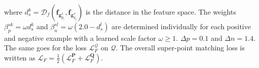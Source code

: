 where $d_s^k=\mathcal{D}_f(\bm{f}_{\bm{g}^s_{\bar{p}_i}},\bm{f}_{\bm{g}^s_{\bar{q}_j}})$ is the distance in the feature space. The weights $\beta_p^{sk}=\omega d_s^k$ and $\beta_n^{sl}{=}\omega (2.0-d_s^l)$ are determined individually for each positive and negative example with a learned scale factor $\omega\geq 1$. $\Delta p = 0.1$ and $\Delta n = 1.4$. The same goes for the loss $\mathcal{L}_{F}^{\bm{\mathcal{Q}}}$ on $\bm{\mathcal{Q}}$. The
overall super-point matching loss is written as
$\mathcal{L}_{F} {=} \frac{1}{2}(\mathcal{L}_{F}^{\mathcal{\bm{P}}} + \mathcal{L}_{F}^{\mathcal{\bm{Q}}})$.
